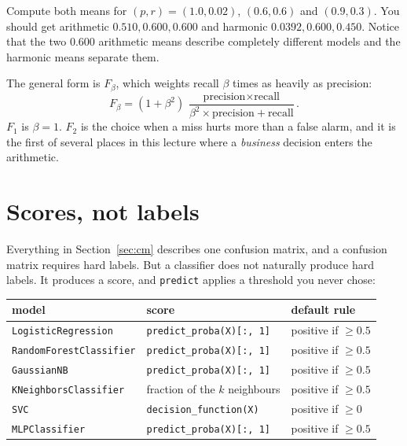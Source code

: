 \documentclass[11pt]{article}
\begin{document}
\begin{tryit}
Compute both means for $(p, r) = (1.0, 0.02)$, $(0.6, 0.6)$ and $(0.9, 0.3)$.
You should get arithmetic $0.510, 0.600, 0.600$ and harmonic
$0.0392, 0.600, 0.450$. Notice that the two $0.600$ arithmetic means describe
completely different models and the harmonic means separate them.
\end{tryit}

The general form is $F_\beta$, which weights recall $\beta$ times as heavily as
precision:
\begin{equation}
F_\beta = (1 + \beta^2)\,
  \frac{\text{precision} \times \text{recall}}
       {\beta^2 \times \text{precision} + \text{recall}} .
\label{eq:fbeta}
\end{equation}
$F_1$ is $\beta = 1$. $F_2$ is the choice when a miss hurts more than a false
alarm, and it is the first of several places in this lecture where a
\emph{business} decision enters the arithmetic.

\section{Scores, not labels}
\label{sec:scores}

Everything in Section~\ref{sec:cm} describes one confusion matrix, and a
confusion matrix requires hard labels. But a classifier does not naturally
produce hard labels. It produces a score, and \texttt{predict} applies a
threshold you never chose:

\begin{center}\small
\begin{tabular}{@{}lll@{}}
\toprule
model & score & default rule \\
\midrule
\texttt{LogisticRegression} & \texttt{predict\_proba(X)[:, 1]} & positive if $\ge 0.5$\\
\texttt{RandomForestClassifier} & \texttt{predict\_proba(X)[:, 1]} & positive if $\ge 0.5$\\
\texttt{GaussianNB} & \texttt{predict\_proba(X)[:, 1]} & positive if $\ge 0.5$\\
\texttt{KNeighborsClassifier} & fraction of the $k$ neighbours & positive if $\ge 0.5$\\
\texttt{SVC} & \texttt{decision\_function(X)} & positive if $\ge 0$\\
\texttt{MLPClassifier} & \texttt{predict\_proba(X)[:, 1]} & positive if $\ge 0.5$\\
\bottomrule
\end{tabular}
\end{center}
\end{document}
